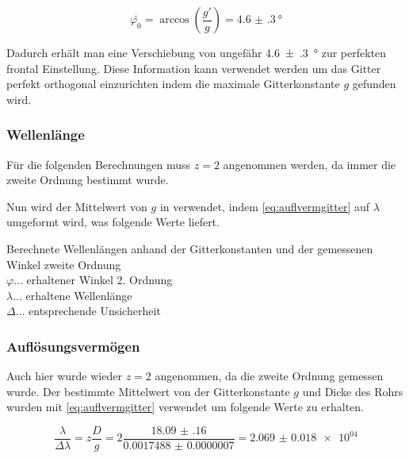 \documentclass[11pt,ngerman]{scrartcl}
\begin{document}
\begin{equation}
	\bar{\varphi_0} = \arccos(\frac{g'}{g}) = \SI{4.6(3)}{\degree}
	\label{eq:initialangle}
\end{equation}

Dadurch erhält man eine Verschiebung von ungefähr
\SI{4.6(3)}{\degree} zur perfekten frontal Einstellung. Diese Information kann
verwendet werden um das Gitter perfekt orthogonal einzurichten
indem die maximale Gitterkonstante $g$ gefunden wird.

\subsubsection{Wellenlänge}

Für die folgenden Berechnungen muss $z = 2$ angenommen werden, da immer die zweite Ordnung bestimmt wurde.

Nun wird der Mittelwert von $g$ in verwendet, indem \autoref{eq:auflvermgitter} auf $\lambda$ umgeformt wird, was folgende Werte liefert.

\begin{table}[H]
	\caption{Berechnete Wellenlängen anhand der Gitterkonstanten und der gemessenen Winkel zweite Ordnung \\ $\varphi \dots$ erhaltener Winkel 2. Ordnung \\ $\lambda \dots$ erhaltene Wellenlänge \\ $\Delta \dots $ entsprechende Unsicherheit}
	\centering
	\label{tab:wertwellenlange}
	
\end{table}

\subsubsection{Auflösungsvermögen}
Auch hier wurde wieder $z = 2$ angenommen, da die zweite Ordnung gemessen wurde. Der bestimmte Mittelwert von der Gitterkonstante $g$ und Dicke des Rohrs wurden mit \autoref{eq:auflvermgitter} verwendet um folgende Werte zu erhalten.

\begin{equation}
	\frac{\lambda}{\Delta \lambda} = z \frac{D}{g} = 2 \frac{\num{18.09(16)}}{\num{0.0017488(7)}} = \num{2.069(18)e+04}
	\label{eq:auflosunggitter}
\end{equation}
\end{document}
